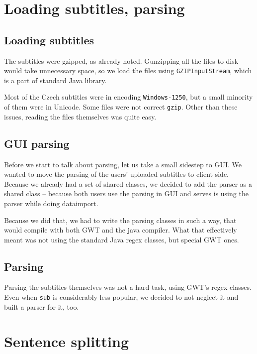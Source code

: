 
\section{Loading subtitles, parsing}
\subsection*{Loading subtitles}
The subtitles were gzipped, as already noted. Gunzipping all the files to disk would take unnecessary space, so we load the files using \texttt{GZIPInputStream}, which is a part of standard Java library.

Most of the Czech subtitles were in encoding \texttt{Windows-1250}, but a small minority of them were in Unicode. Some files were not correct \texttt{gzip}. Other than these issues, reading the files themselves was quite easy.

\subsection*{GUI parsing}
Before we start to talk about parsing, let us take a small sidestep to GUI. We wanted to move the parsing of the users' uploaded subtitles to client side. Because we already had a set of shared classes, we decided to add the parser as a shared class -- because both users use the parsing in GUI and serves is using the parser while doing dataimport.

Because we did that, we had to write the parsing classes in such a way, that would compile with both GWT and the java compiler. What that effectively meant was not using the standard Java regex classes, but special GWT ones.

\subsection*{Parsing}
Parsing the subtitles themselves was not a hard task, using GWT's regex classes. Even when \texttt{sub} is considerably less popular, we decided to not neglect it and built a parser for it, too.

\section{Sentence splitting}
